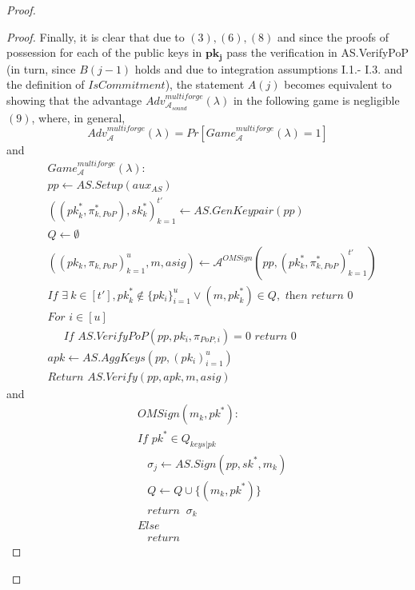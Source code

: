 \begin{proof}
\begin{proof}
\noindent Finally, it is clear that due to $(3), (6), (8)$ and since the proofs of possession for each of the public 
keys in $\mathbf{pk_j}$ pass the verification in AS.VerifyPoP (in turn, since $B(j-1)$ holds and due to integration assumptions 
I.1.- I.3. and the definition of $\mathit{IsCommitment}$), the statement $A(j)$ 
becomes equivalent to showing that the advantage
$\mathit{Adv}^{\mathit{multiforge}}_{\mathcal{A}_{\mathit{sound}}}({\lambda})$ in the following game is negligible $(9)$,
where, in general, 
$$\mathit{Adv}^{\mathit{multiforge}}_{\mathcal{A}}({\lambda}) = \mathit{Pr}[\mathit{Game}^{\mathit{multiforge}}_{\mathcal{A}}({\lambda}) =1]$$
\noindent and 
\begin{align*}
&\mathit{Game}^{\mathit{multiforge}}_{\mathcal{A}}({\lambda}): \\
& \mathit{pp} \leftarrow \mathit{AS.Setup}(\mathit{aux_{\mathit{AS}}}) \\
& ((\mathit{pk}_{k}^*,\pi^*_{k, \mathit{PoP}}), \mathit{sk}_{k}^*)_{k=1}^{t'} \leftarrow \mathit{AS.GenKeypair}(\mathit{pp})\\
& Q \leftarrow \emptyset \ \\
& ((\mathit{pk_k}, \pi_{k,\mathit{PoP}})_{k=1}^{u}, m, \mathit{asig}) \leftarrow \mathcal{A}^{\mathit{OMSign}}(\mathit{pp}, (\mathit{pk_k^*},\pi^*_{k,\mathit{PoP}})_{k=1}^{t'}) \\
& \textit{If } \exists \ k \in [t'], \mathit{pk}_{k}^*  \notin \{ \mathit{pk_i} \}_{i=1}^{u}  \vee (m, \mathit{pk}^*_{k}) \in Q, \textit{ then return } 0 \\
& \textit{For } i \in [u] \\
& \ \ \ \ \ \textit{ If } \mathit{AS.VerifyPoP}(\mathit{pp}, \mathit{pk_i}, \pi_{\mathit{PoP},i})=0  \textit{ return } 0 \\
& \mathit{apk} \leftarrow \mathit{AS.AggKeys}(\mathit{pp}, (\mathit{pk_i})_{i=1}^{u}) \\
& \textit{Return } \mathit{AS.Verify}(\mathit{pp}, \mathit{apk}, m, \mathit{asig})
\end{align*}
\noindent and
\begin{align*}
& \mathit{OMSign}(m_k, \mathit{pk}^*): \\
& \textit{If } \mathit{pk}^* \in Q_{\mathit{keys}|\mathit{pk}} \\
& \ \ \ \ \sigma_j \leftarrow \mathit{AS.Sign}(\mathit{pp}, \mathit{sk}^*, m_k) \\
& \ \ \ \  Q \leftarrow Q \cup \{(m_k,  \mathit{pk}^*) \} \\
& \ \ \ \ \textit{return } \ \sigma_k \\
& Else \\
& \ \ \ \ \textit{return}
\end{align*}


\end{proof}
\end{proof}
